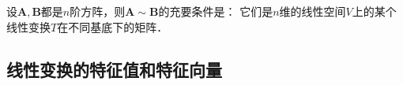     \begin{theorem}
        设$\boldsymbol{A},\boldsymbol{B}$都是$n$阶方阵，则$\boldsymbol{A}\sim \boldsymbol{B}$的充要条件是：
        它们是$n$维的线性空间$V$上的某个线性变换$T$在不同基底下的矩阵．
    \end{theorem}


\subsection{线性变换的特征值和特征向量}